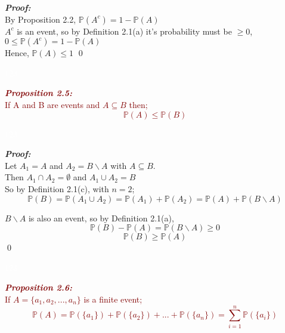 \documentclass{report}
\newenvironment{cframedp}[1][Black]
  {\begin{tcolorbox}[colframe=#1,colback=white]}
  {\end{tcolorbox}}
\newenvironment{cframedprop}[1][Maroon]
  {\begin{tcolorbox}[colframe=#1,colback=white]}
  {\end{tcolorbox}}
\begin{document}
\begin{cframedp}
\textit{\textbf{Proof:}}\\
By Proposition 2.2, $\mathbb{P}(A^c) = 1 - \mathbb{P}(A) $\\
$A^c$ is an event, so by Definition 2.1(a) it's probability must be $\geq 0$,\\
$0 \leq \mathbb{P}(A^c) = 1 - \mathbb{P}(A)$\\

Hence, $\mathbb{P}(A) \leq 1$
\qed
\end{cframedp}

\textcolor{White}{123}

\begin{cframedprop}
\textcolor{Maroon}{\textit{\textbf{Proposition 2.5:}}}\\
\textcolor{Maroon}{If A and B are events and $A \subseteq B$ then;
\begin{equation}
    \mathbb{P}(A) \leq \mathbb{P}(B)
\end{equation}}
\end{cframedprop}

\textcolor{White}{123}

\begin{cframedp}
\textit{\textbf{Proof:}}\\
Let $A_1 = A$ and $A_2 = B \backslash A$ with $A \subseteq B.$\\
Then $A_1 \cap A_2 = \emptyset $ and $A_1 \cup A_2 = B$\\

So by Definition 2.1(c), with $n = 2$;
\begin{equation}
    \mathbb{P}(B) = \mathbb{P}(A_1 \cup A_2) = \mathbb{P}(A_1) + \mathbb{P}(A_2) = \mathbb{P}(A) + \mathbb{P}(B \backslash A)
\end{equation}

$B \backslash A$ is also an event, so by Definition 2.1(a),
\begin{equation}
    \mathbb{P}(B) - \mathbb{P}(A) = \mathbb{P}(B \backslash A) \geq 0
\end{equation}
\begin{equation}
    \mathbb{P}(B) \geq \mathbb{P}(A)
\end{equation}
\qed
\end{cframedp}

\textcolor{White}{123}

\begin{cframedprop}
\textcolor{Maroon}{\textit{\textbf{Proposition 2.6:}}}\\
\textcolor{Maroon}{If $A = \{ a_1, a_2,...,a_n \}$ is a finite event;
\begin{equation}
    \mathbb{P}(A) = \mathbb{P}( \{a_1 \}) + \mathbb{P}( \{a_2 \}) + ... + \mathbb{P}( \{a_n \}) = \sum_{i=1}^{n} \mathbb{P}( \{ a_i \} )
\end{equation}}
\end{cframedprop}
\end{document}

